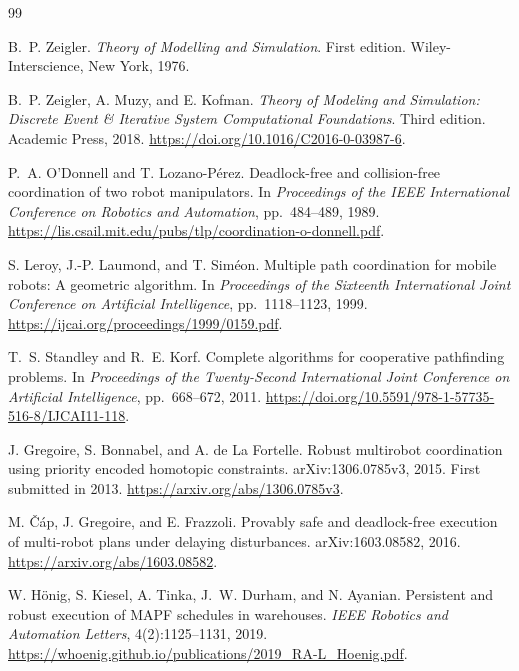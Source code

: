 \documentclass[11pt,a4paper]{article}
\theoremstyle{remark}
\newcounter{algorithm}
\begin{document}
\begin{thebibliography}{99}

B.~P. Zeigler.
\newblock \emph{Theory of Modelling and Simulation}.
\newblock First edition. Wiley-Interscience, New York, 1976.

B.~P. Zeigler, A. Muzy, and E. Kofman.
\newblock \emph{Theory of Modeling and Simulation: Discrete Event \& Iterative
System Computational Foundations}.
\newblock Third edition. Academic Press, 2018.
\newblock \url{https://doi.org/10.1016/C2016-0-03987-6}.

P.~A. O'Donnell and T. Lozano-P\'erez.
\newblock Deadlock-free and collision-free coordination of two robot manipulators.
\newblock In \emph{Proceedings of the IEEE International Conference on Robotics
and Automation}, pp.~484--489, 1989.
\newblock \url{https://lis.csail.mit.edu/pubs/tlp/coordination-o-donnell.pdf}.

S. Leroy, J.-P. Laumond, and T. Sim\'eon.
\newblock Multiple path coordination for mobile robots: A geometric algorithm.
\newblock In \emph{Proceedings of the Sixteenth International Joint Conference
on Artificial Intelligence}, pp.~1118--1123, 1999.
\newblock \url{https://ijcai.org/proceedings/1999/0159.pdf}.

T.~S. Standley and R.~E. Korf.
\newblock Complete algorithms for cooperative pathfinding problems.
\newblock In \emph{Proceedings of the Twenty-Second International Joint
Conference on Artificial Intelligence}, pp.~668--672, 2011.
\newblock \url{https://doi.org/10.5591/978-1-57735-516-8/IJCAI11-118}.

J. Gregoire, S. Bonnabel, and A. de La Fortelle.
\newblock Robust multirobot coordination using priority encoded homotopic constraints.
\newblock arXiv:1306.0785v3, 2015. First submitted in 2013.
\newblock \url{https://arxiv.org/abs/1306.0785v3}.

M. \v{C}\'ap, J. Gregoire, and E. Frazzoli.
\newblock Provably safe and deadlock-free execution of multi-robot plans under
delaying disturbances.
\newblock arXiv:1603.08582, 2016.
\newblock \url{https://arxiv.org/abs/1603.08582}.

W. H\"onig, S. Kiesel, A. Tinka, J.~W. Durham, and N. Ayanian.
\newblock Persistent and robust execution of MAPF schedules in warehouses.
\newblock \emph{IEEE Robotics and Automation Letters}, 4(2):1125--1131, 2019.
\newblock \url{https://whoenig.github.io/publications/2019_RA-L_Hoenig.pdf}.


\end{thebibliography}
\end{document}
